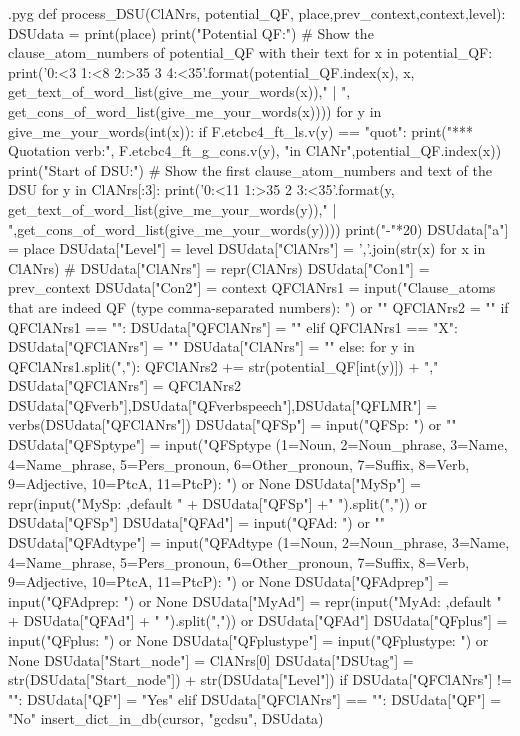 \documentclass{report}
\makeatletter
\newenvironment{python}{%
  \VerbatimEnvironment
  \minted@resetoptions
  \setkeys{minted@opt}{}
      \begin{VerbatimOut}{\jobname.pyg}}
{%
      \end{VerbatimOut}
      \minted@pygmentize{python}
      \DeleteFile{\jobname.pyg}}
\makeatother
\begin{document}
\begin{python}
def process_DSU(ClANrs, potential_QF, place,prev_context,context,level):
    DSUdata = {}
    print(place)
    print("Potential QF:")  # Show the clause_atom_numbers of potential_QF with their text
    for x in potential_QF:
        print('{0:<3} {1:<8} {2:>35} {3} {4:<35}'.format(potential_QF.index(x), x, get_text_of_word_list(give_me_your_words(x))," | ", get_cons_of_word_list(give_me_your_words(x))))
        for y in give_me_your_words(int(x)):
            if F.etcbc4_ft_ls.v(y) == "quot":
                print("*** Quotation verb:", F.etcbc4_ft_g_cons.v(y), "in ClANr",potential_QF.index(x))
    print("Start of DSU:")  # Show the first clause_atom_numbers and text of the DSU
    for y in ClANrs[:3]:
        print('{0:<11} {1:>35} {2} {3:<35}'.format(y, get_text_of_word_list(give_me_your_words(y))," | ",get_cons_of_word_list(give_me_your_words(y))))
    print("-"*20)
    DSUdata["a"] = place
    DSUdata["Level"] = level
    DSUdata["ClANrs"] = ','.join(str(x) for x in ClANrs)
#    DSUdata["ClANrs"] = repr(ClANrs)
    DSUdata["Con1"] = prev_context
    DSUdata["Con2"] = context
    QFClANrs1 = input("Clause_atoms that are indeed QF (type comma-separated numbers): ") or ""
    QFClANrs2 = ""
    if QFClANrs1 == "":
        DSUdata["QFClANrs"] = ""
    elif QFClANrs1 == "X":
        DSUdata["QFClANrs"] = ""
        DSUdata["ClANrs"] = ""
    else:
        for y in QFClANrs1.split(","):
            QFClANrs2 += str(potential_QF[int(y)]) + ","
        DSUdata["QFClANrs"] = QFClANrs2
    DSUdata["QFverb"],DSUdata["QFverbspeech"],DSUdata["QFLMR"] = verbs(DSUdata["QFClANrs"])
    DSUdata["QFSp"] = input("QFSp: ") or ""
    DSUdata["QFSptype"] = input("QFSptype (1=Noun, 2=Noun_phrase, 3=Name, 4=Name_phrase, 5=Pers_pronoun, 6=Other_pronoun, 7=Suffix, 8=Verb, 9=Adjective, 10=PtcA, 11=PtcP): ") or None
    DSUdata["MySp"] = repr(input("MySp: ,default " + DSUdata["QFSp"] +" ").split(",")) or DSUdata["QFSp"]
    DSUdata["QFAd"] = input("QFAd: ") or ""
    DSUdata["QFAdtype"] = input("QFAdtype (1=Noun, 2=Noun_phrase, 3=Name, 4=Name_phrase, 5=Pers_pronoun, 6=Other_pronoun, 7=Suffix, 8=Verb, 9=Adjective, 10=PtcA, 11=PtcP): ") or None
    DSUdata["QFAdprep"] = input("QFAdprep: ") or None
    DSUdata["MyAd"] = repr(input("MyAd: ,default " + DSUdata["QFAd"] + " ").split(",")) or DSUdata["QFAd"]
    DSUdata["QFplus"] = input("QFplus: ") or None
    DSUdata["QFplustype"] = input("QFplustype: ") or None
    DSUdata["Start_node"] = ClANrs[0]
    DSUdata["DSUtag"] = str(DSUdata["Start_node"]) + str(DSUdata["Level"])
    if DSUdata["QFClANrs"] != "":
        DSUdata["QF"] = "Yes"
    elif DSUdata["QFClANrs"] == "":
        DSUdata["QF"] = "No"
    insert_dict_in_db(cursor, "gcdsu", DSUdata)

\end{python}
\end{document}
